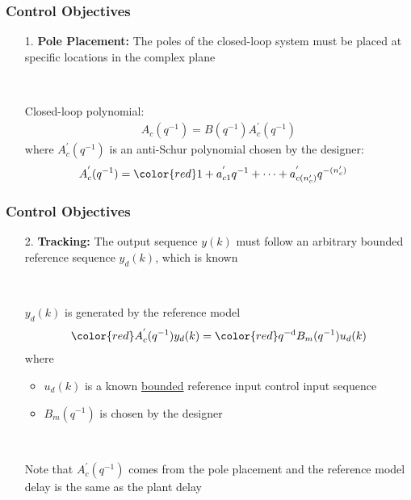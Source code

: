 \begin{frame}
    \frametitle{Control Objectives}
    \begin{enumerate}
        \item[1.]
        \textbf{Pole Placement: } The poles of the closed-loop system must be placed at specific locations in the complex plane

        $ \ $
        \pause

        Closed-loop polynomial:
        \begin{align*}
            A_c(q^{-1}) = B(q^{-1}) A_c^{'}(q^{-1})
        \end{align*}
        where $A_c^{'}(q^{-1})$ is an anti-Schur polynomial chosen by the designer:
        \begin{align*}
            A_c^{'}(q^{-1}) & = {\color{red} 1} + a_{c1}^{'} q^{-1} + \cdots + a_{c(n_c')}^{'} q^{-(n_c')}
        \end{align*}
    \end{enumerate}

\end{frame}

\begin{frame}
    \frametitle{Control Objectives}
    \begin{enumerate}
        \item[2.]
        \textbf{Tracking: } The output sequence $y(k)$ must follow an arbitrary bounded reference sequence $y_d(k)$, which is known

        $ \ $
        \pause

        $y_d(k)$ is generated by the reference model
        \begin{align*}
            {\color{red} A_c^{'}(q^{-1})} y_d(k) = {\color{red}q^{-\drm}} B_m(q^{-1}) u_d(k)
        \end{align*}
        where
        \begin{itemize}
            \item
            $u_d(k)$ is a known \underline{bounded} reference input control input sequence

            \item
            $B_m(q^{-1})$ is chosen by the designer
        \end{itemize}

        $ \ $
        \pause

        Note that $A_c^{'}(q^{-1})$ comes from the pole placement and the reference model delay is the same as the plant delay
    \end{enumerate}
\end{frame}

